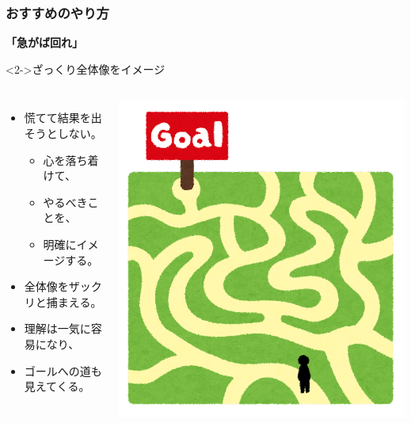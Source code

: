 \documentclass[unicode,12pt]{beamer}%
\begin{document}

\begin{frame}
	\frametitle{おすすめのやり方}
	
	\begin{center}
		{\Huge \textbf{「急がば回れ」}}
	\end{center}
	
	\vspace{5mm}
	\begin{alertblock}<2->{ざっくり全体像をイメージ}
		\begin{columns}[c, onlytextwidth]
			\begin{itemize}
				\item 慌てて結果を出そうとしない。
				\begin{itemize}
					\item 心を落ち着けて、
					\item やるべきことを、
					\item 明確にイメージする。
				\end{itemize}
				\item 全体像をザックリと捕まえる。
				\item 理解は一気に容易になり、
				\item ゴールへの道も見えてくる。
			\end{itemize}
					\centering
						\includegraphics[width=\textwidth]{goal.png}
		\end{columns}
	\end{alertblock}
\end{frame}
\end{document}
